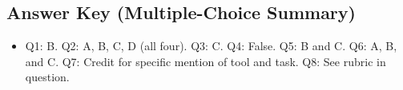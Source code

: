 \documentclass[11pt,letterpaper]{article}
\begin{document}
\subsection{Answer Key (Multiple-Choice Summary)}

\begin{itemize}
    \item Q1: B. \quad Q2: A, B, C, D (all four). \quad Q3: C. \quad Q4: False. \quad Q5: B and C. \quad Q6: A, B, and C. \quad Q7: Credit for specific mention of tool and task. \quad Q8: See rubric in question.
\end{itemize}
\end{document}
